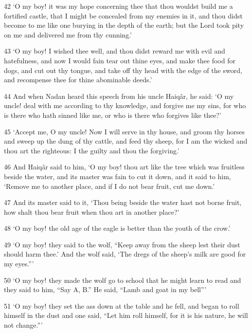 \par 42 ‘O my boy! it was my hope concerning thee that thou wouldst build me a fortified castle, that I might be concealed from my enemies in it, and thou didst become to me like one burying in the depth of the earth; but the Lord took pity on me and delivered me from thy cunning.’

\par 43 ‘O my boy! I wished thee well, and thou didst reward me with evil and hatefulness, and now I would fain tear out thine eyes, and make thee food for dogs, and cut out thy tongue, and take off thy head with the edge of the sword, and recompense thee for thine abominable deeds.’

\par 44 And when Nadan heard this speech from his uncle Haiqâr, he said: ‘O my uncle! deal with me according to thy knowledge, and forgive me my sins, for who is there who hath sinned like me, or who is there who forgives like thee?’

\par 45 ‘Accept me, O my uncle! Now I will serve in thy house, and groom thy horses and sweep up the dung of thy cattle, and feed thy sheep, for I am the wicked and thou art the righteous: I the guilty and thou the forgiving.’

\par 46 And Haiqâr said to him, ‘O my boy! thou art like the tree which was fruitless beside the water, and its master was fain to cut it down, and it said to him, ‘Remove me to another place, and if I do not bear fruit, cut me down.’

\par 47 And its master said to it, ‘Thou being beside the water hast not borne fruit, how shalt thou bear fruit when thou art in another place?’

\par 48 ‘O my boy! the old age of the eagle is better than the youth of the crow.’

\par 49 ‘O my boy! they said to the wolf, “Keep away from the sheep lest their dust should harm thee.’ And the wolf said, ‘The dregs of the sheep's milk are good for my eyes.”’

\par 50 ‘O my boy! they made the wolf go to school that he might learn to read and they said to him, “Say A, B.” He said, “Lamb and goat in my bell”’

\par 51 ‘O my boy! they set the ass down at the table and he fell, and began to roll himself in the dust and one said, “Let him roll himself, for it is his nature, he will not change.”’

